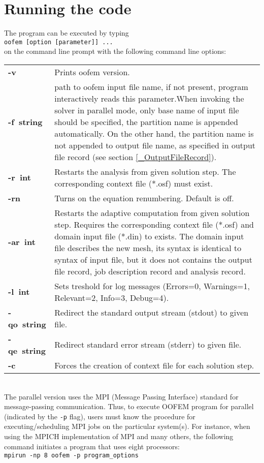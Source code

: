 \documentclass[a4paper]{article}
\newcommand{\Pmode}[1]{{\sffamily #1}}
\begin{document}
\section{Running the code}
\label{_running_the_code}
The program can be executed by typing\\
\texttt{oofem [option [parameter]] ...}\\
on the command line prompt with the following command line options:\\[1em]
\begin{tabularx}{\textwidth}{l|X}
\hline
\textbf{\mbox{-v}} & Prints oofem version.\\
\textbf{\mbox{-f~string}} & path to oofem input file name, if not present, program interactively
reads this parameter.\Pmode{When invoking the solver in parallel mode, only base name of input file should be specified, 
the partition name is appended automatically. On the other hand, the partition name is not appended to output file name, as specified
in output file record (see section \ref{_OutputFileRecord}).}\\
\textbf{\mbox{-r~int}} & Restarts the analysis from given solution step. The corresponding
context file (*.osf) must exist.\\
\textbf{\mbox{-rn}} & Turns on the equation renumbering. Default is off.\\
\textbf{\mbox{-ar~int}} & 
Restarts the adaptive computation from given solution step.
Requires the corresponding context file (*.osf) and domain input file
(*.din) to exists. The domain input file describes the new mesh, its
syntax is identical to syntax of input file, but it does not contains
the output file record, job description record and analysis record.\\
\textbf{\mbox{-l~int}} & Sets treshold for log messages (Errors=0, Warnings=1,
Relevant=2, Info=3, Debug=4).\\
\textbf{\mbox{-qo~string}} & Redirect the standard output stream (stdout) to given file.\\
\textbf{\mbox{-qe~string}} & Redirect standard error stream (stderr) to given file.\\
\textbf{\mbox{-c}} & Forces the creation of context file for each solution step.\\
\hline
\end{tabularx}\\[1em]

\Pmode{
The parallel version uses the MPI (Message Passing Interface) standard for message-passing communication. Thus, to execute OOFEM program for parallel (indicated by the \texttt{-p} flag),
users must know the procedure for executing/scheduling MPI jobs on the particular system(s).
For instance, when using the MPICH implementation of MPI and many others, the following command initiates a program that uses eight processors: \\[2mm]
\texttt{mpirun -np 8 oofem -p program\_options}
}
\end{document}
